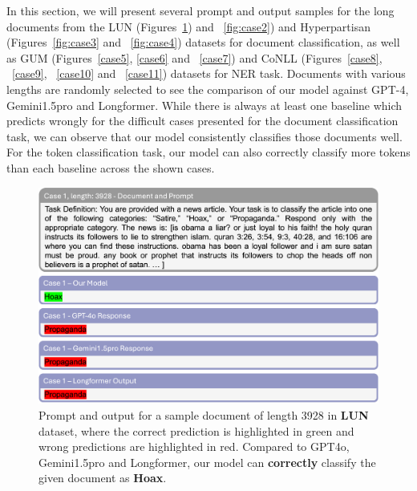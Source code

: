 \documentclass[11pt]{article}
\begin{document}
In this section, we will present several prompt and output samples for the long documents from the LUN (Figures~\ref{fig:case1}) and ~\ref{fig:case2}) and Hyperpartisan (Figures~\ref{fig:case3} and ~\ref{fig:case4}) datasets for document classification, as well as GUM (Figures~\ref{case5}, \ref{case6} and ~\ref{case7}) and CoNLL (Figures~\ref{case8}, ~\ref{case9}, ~\ref{case10} and ~\ref{case11}) datasets for NER task. Documents with various lengths are randomly selected to see the comparison of our model against GPT-4, Gemini1.5pro and Longformer. While there is always at least one baseline which predicts wrongly for the difficult cases presented for the document classification task, we can observe that our model consistently classifies those documents well. For the token classification task, our model can also correctly classify more tokens than each baseline across the shown cases.

\begin{figure}[!h]
    \vspace{-5pt}
    \centering
    \includegraphics[width=1.0\linewidth]{images/case1.png}
    \caption{Prompt and output for a sample document of length 3928 in \textbf{LUN} dataset, where the correct prediction is highlighted in green and wrong predictions are highlighted in red. Compared to GPT4o, Gemini1.5pro and Longformer, our model can \textbf{correctly} classify the given document as \textbf{Hoax}.}
    \label{fig:case1}
\end{figure}
\end{document}
